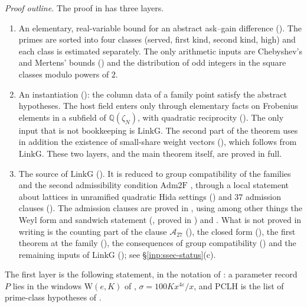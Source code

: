\documentclass[10pt]{amsart}
\theoremstyle{definition}
\theoremstyle{remark}
\newcommand{\Q}{\mathbb Q}
\begin{document}
\emph{Proof outline.} The proof in \cite[\S\ref{A-i1:ssec-overview}]{Annex}
has three layers.
\begin{enumerate}
\item An elementary, real-variable bound for an abstract ask--gain
difference (\cite[Theorem~\ref{A-i1:thm-elementary}]{Annex}). The primes are
sorted into four classes (served, first kind, second kind, high) and each
class is estimated separately. The only arithmetic inputs are Chebyshev's
and Mertens' bounds (\cite[Lemma~\ref{A-i1:lem-cheb}]{Annex}) and the
distribution of odd integers in the square classes modulo powers of $2$.
\item An instantiation (\cite[Theorem~\ref{A-i1:thm-setting}]{Annex}): the
column data of a family point satisfy the abstract hypotheses. The host
field enters only through elementary facts on Frobenius elements in a
subfield of $\Q(\zeta_N)$, with quadratic reciprocity
(\cite[Theorem~\ref{A-i1:thm-qr}]{Annex}). The only input that is not
bookkeeping is $\mathrm{LinkG}$. The second part of the theorem uses in
addition the existence of small-share weight vectors
(\cite[Proposition~\ref{A-i1:prop-chosenW}]{Annex}), which follows from
$\mathrm{LinkG}$. These two layers, and the main theorem itself, are
proved in full.
\item The source of $\mathrm{LinkG}$ (\cite[\S\ref{A-i1:ssec-linkG-source}]{Annex}).
It is reduced to group
compatibility of the families and the second admissibility condition
$\mathrm{Adm2F}$ \cite[Definition~\ref{A-i1:def-groupcompat}]{Annex}, through
a local statement about lattices in unramified quadratic Hida settings
(\cite[Proposition~\ref{A-i1:prop-loc}]{Annex}) and $37$ admission clauses
(\cite[Proposition~\ref{A-i1:prop-adm}]{Annex}). The admission clauses are
proved in \cite[\S\ref{A-i1:ssec-pf-adm}]{Annex}, using among other things
the Weyl form and sandwich statement
(\cite[Proposition~\ref{A-i1:prop-Fm}]{Annex}, proved in
\cite[\S\ref{A-i1:ssec-pf-Fm}]{Annex}) and
\cite[Propositions~\ref{A-i1:prop-A19c} and~\ref{A-i1:prop-A21}]{Annex}. What
is not proved in writing is the counting part of the clause
$\mathcal A_{27}$ (\cite[Proposition~\ref{A-i1:prop-segdeg-rest}]{Annex}),
the closed form (\cite[Proposition~\ref{A-i1:prop-closed}]{Annex}), the
first theorem at the family (\cite[Proposition~\ref{A-i1:prop-first}]{Annex}),
the consequences of group compatibility
(\cite[Proposition~\ref{A-i1:prop-gc}]{Annex}) and the remaining inputs of
$\mathrm{LinkG}$ (\cite[Proposition~\ref{A-i1:prop-linkG-res}]{Annex}); see
\S\ref{inp:ssec-status}(c).
\end{enumerate}
The first layer is the following statement, in the notation of
\cite[\S\S\ref{A-i1:ssec-params}--\ref{A-i1:ssec-elementary}]{Annex}: a
parameter record $P$ lies in the windows $\mathrm W(e,K)$ of
\cite[Definition~\ref{A-i1:def-windows}]{Annex}, $\sigma=100Kx^{4\varepsilon}/x$,
and $\mathrm{PCLH}$ is the list of prime-class hypotheses of
\cite[Definition~\ref{A-i1:def-PCLH}]{Annex}.
\end{document}
